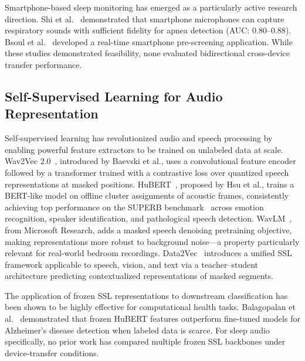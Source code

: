 \documentclass[conference]{IEEEtran}
\begin{document}
Smartphone-based sleep monitoring has emerged as a particularly active research
direction. Shi et al.~\cite{shi2018} demonstrated that smartphone microphones can
capture respiratory sounds with sufficient fidelity for apnea detection (AUC:
0.80--0.88). Bsoul et al.~\cite{bsoul2011} developed a real-time smartphone
pre-screening application. While these studies demonstrated feasibility, none
evaluated bidirectional cross-device transfer performance.

\subsection{Self-Supervised Learning for Audio Representation}

Self-supervised learning has revolutionized audio and speech processing by enabling
powerful feature extractors to be trained on unlabeled data at scale. Wav2Vec
2.0~\cite{baevski2020}, introduced by Baevski et al., uses a convolutional feature
encoder followed by a transformer trained with a contrastive loss over quantized
speech representations at masked positions. HuBERT~\cite{hsu2021}, proposed by Hsu
et al., trains a BERT-like model on offline cluster assignments of acoustic frames,
consistently achieving top performance on the SUPERB benchmark~\cite{yang2021} across
emotion recognition, speaker identification, and pathological speech detection.
WavLM~\cite{chen2022}, from Microsoft Research, adds a masked speech denoising
pretraining objective, making representations more robust to background noise---a
property particularly relevant for real-world bedroom recordings. Data2Vec~\cite{baevski2022}
introduces a unified SSL framework applicable to speech, vision, and text via a
teacher--student architecture predicting contextualized representations of masked
segments.

The application of frozen SSL representations to downstream classification has been
shown to be highly effective for computational health tasks. Balagopalan et
al.~\cite{balagopalan2021} demonstrated that frozen HuBERT features outperform
fine-tuned models for Alzheimer's disease detection when labeled data is scarce. For
sleep audio specifically, no prior work has compared multiple frozen SSL backbones
under device-transfer conditions.

\end{document}
